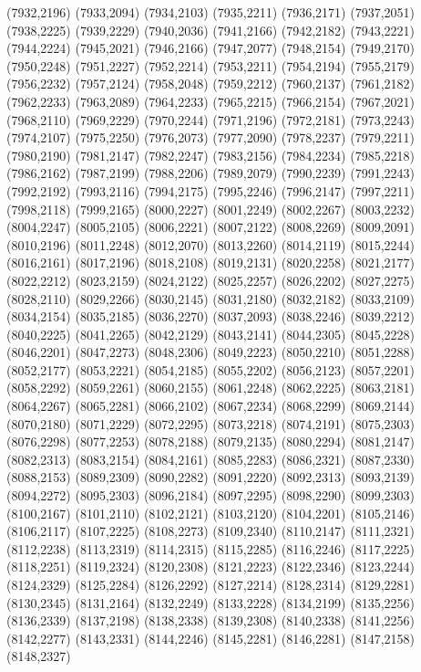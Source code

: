 (7932,2196)
(7933,2094)
(7934,2103)
(7935,2211)
(7936,2171)
(7937,2051)
(7938,2225)
(7939,2229)
(7940,2036)
(7941,2166)
(7942,2182)
(7943,2221)
(7944,2224)
(7945,2021)
(7946,2166)
(7947,2077)
(7948,2154)
(7949,2170)
(7950,2248)
(7951,2227)
(7952,2214)
(7953,2211)
(7954,2194)
(7955,2179)
(7956,2232)
(7957,2124)
(7958,2048)
(7959,2212)
(7960,2137)
(7961,2182)
(7962,2233)
(7963,2089)
(7964,2233)
(7965,2215)
(7966,2154)
(7967,2021)
(7968,2110)
(7969,2229)
(7970,2244)
(7971,2196)
(7972,2181)
(7973,2243)
(7974,2107)
(7975,2250)
(7976,2073)
(7977,2090)
(7978,2237)
(7979,2211)
(7980,2190)
(7981,2147)
(7982,2247)
(7983,2156)
(7984,2234)
(7985,2218)
(7986,2162)
(7987,2199)
(7988,2206)
(7989,2079)
(7990,2239)
(7991,2243)
(7992,2192)
(7993,2116)
(7994,2175)
(7995,2246)
(7996,2147)
(7997,2211)
(7998,2118)
(7999,2165)
(8000,2227)
(8001,2249)
(8002,2267)
(8003,2232)
(8004,2247)
(8005,2105)
(8006,2221)
(8007,2122)
(8008,2269)
(8009,2091)
(8010,2196)
(8011,2248)
(8012,2070)
(8013,2260)
(8014,2119)
(8015,2244)
(8016,2161)
(8017,2196)
(8018,2108)
(8019,2131)
(8020,2258)
(8021,2177)
(8022,2212)
(8023,2159)
(8024,2122)
(8025,2257)
(8026,2202)
(8027,2275)
(8028,2110)
(8029,2266)
(8030,2145)
(8031,2180)
(8032,2182)
(8033,2109)
(8034,2154)
(8035,2185)
(8036,2270)
(8037,2093)
(8038,2246)
(8039,2212)
(8040,2225)
(8041,2265)
(8042,2129)
(8043,2141)
(8044,2305)
(8045,2228)
(8046,2201)
(8047,2273)
(8048,2306)
(8049,2223)
(8050,2210)
(8051,2288)
(8052,2177)
(8053,2221)
(8054,2185)
(8055,2202)
(8056,2123)
(8057,2201)
(8058,2292)
(8059,2261)
(8060,2155)
(8061,2248)
(8062,2225)
(8063,2181)
(8064,2267)
(8065,2281)
(8066,2102)
(8067,2234)
(8068,2299)
(8069,2144)
(8070,2180)
(8071,2229)
(8072,2295)
(8073,2218)
(8074,2191)
(8075,2303)
(8076,2298)
(8077,2253)
(8078,2188)
(8079,2135)
(8080,2294)
(8081,2147)
(8082,2313)
(8083,2154)
(8084,2161)
(8085,2283)
(8086,2321)
(8087,2330)
(8088,2153)
(8089,2309)
(8090,2282)
(8091,2220)
(8092,2313)
(8093,2139)
(8094,2272)
(8095,2303)
(8096,2184)
(8097,2295)
(8098,2290)
(8099,2303)
(8100,2167)
(8101,2110)
(8102,2121)
(8103,2120)
(8104,2201)
(8105,2146)
(8106,2117)
(8107,2225)
(8108,2273)
(8109,2340)
(8110,2147)
(8111,2321)
(8112,2238)
(8113,2319)
(8114,2315)
(8115,2285)
(8116,2246)
(8117,2225)
(8118,2251)
(8119,2324)
(8120,2308)
(8121,2223)
(8122,2346)
(8123,2244)
(8124,2329)
(8125,2284)
(8126,2292)
(8127,2214)
(8128,2314)
(8129,2281)
(8130,2345)
(8131,2164)
(8132,2249)
(8133,2228)
(8134,2199)
(8135,2256)
(8136,2339)
(8137,2198)
(8138,2338)
(8139,2308)
(8140,2338)
(8141,2256)
(8142,2277)
(8143,2331)
(8144,2246)
(8145,2281)
(8146,2281)
(8147,2158)
(8148,2327)
